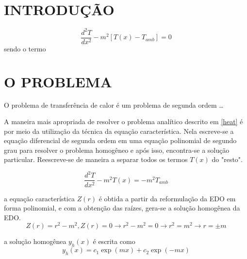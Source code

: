 \documentclass[a4paper, 12pt]{article}
\begin{document}
\vspace{0.5cm}

\section{INTRODUÇÃO}


\begin{equation}
  \label{heat}
  \frac{d^2 T}{dx^2} - m^2 [T(x) - T_{amb}] = 0
\end{equation}
sendo o termo 
\section{O PROBLEMA}

O problema de transferência de calor é um problema de segunda ordem \ldots\newline

A maneira mais apropriada de resolver o problema analítico descrito em \ref{heat} é por meio da utilização da técnica da equação característica. Nela escreve-se a equação diferencial de segunda
ordem em uma equação polinomial de segundo grau para resolver o problema homogêneo e após isso, encontra-se a solução particular. Reescreve-se \label{heat} de maneira a separar todos os termos $T(x)$ do
"resto".

\begin{equation}
  \label{heatmodified}
  \frac{d^2 T}{dx^2} - m^2 T(x) = - m^2 T_{amb} 
\end{equation}

a equação característica $Z(r)$ é obtida a partir da reformulação da EDO em forma polinomial, e com a obtenção das raízes, gera-se a solução homogênea da EDO. 
\begin{equation}
  \label{caracter}
  Z(r) = r^2 - m^2, Z(r) = 0  \rightarrow  r^2 - m^2 = 0 \rightarrow  r^2 = m^2 \rightarrow  r = \pm m 
\end{equation}

a solução homogênea $y_{h}(x)$ é escrita como 
\begin{equation}
  \label{homogenous}
  y_{h}(x) = c_1 \exp(mx) + c_2 \exp(-mx)
\end{equation}
\newline
\end{document}
